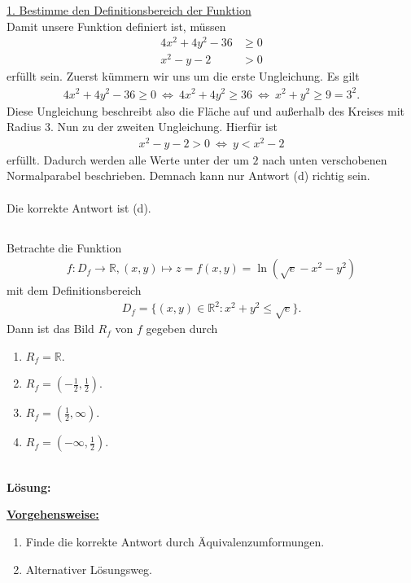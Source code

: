 \underline{1. Bestimme den Definitionsbereich der Funktion}\\
Damit unsere Funktion definiert ist, müssen 
\begin{align*}
4x^2 +4y^2 - 36 &\geq 0\\
x^2 -y -2 &> 0
\end{align*}
erfüllt sein.
Zuerst kümmern wir uns um die erste Ungleichung.
Es gilt
\begin{align*}
4x^2 + 4y^2 - 36 \geq 0 \ \Leftrightarrow \
4x^2 + 4y^2 \geq 36 
\ \Leftrightarrow \
x^2 + y^2 \geq 9 = 3^2. 
\end{align*}
Diese Ungleichung beschreibt also die Fläche auf und außerhalb des Kreises mit Radius 3.
Nun zu der zweiten Ungleichung. Hierfür ist
\begin{align*}
x^2 - y - 2 > 0 
\ \Leftrightarrow \
y < x^2 -2  
\end{align*}
erfüllt. Dadurch werden alle Werte unter der um $ 2 $ nach unten verschobenen Normalparabel beschrieben.
Demnach kann nur Antwort (d) richtig sein.\\
\\
Die korrekte Antwort ist (d).
\newpage

\subsection*{}
Betrachte die Funktion
\begin{align*}
f : D_f \to \mathbb{R}, 
(x,y) \mapsto z = f(x,y) = \ln(\sqrt{e} -x^2 -y^2)
\end{align*}
mit dem Definitionsbereich
\begin{align*}
D_f
= \{
(x,y) \in \mathbb{R}^2 : x^2 + y^2 \leq \sqrt{e}
\}.
\end{align*}
Dann ist das Bild $ R_f $ von $ f $ gegeben durch
\renewcommand{\labelenumi}{(\alph{enumi})}
\begin{enumerate}
	\item 
	$R_f = \mathbb{R} $.
	\item
	$R_f = \left( -\frac{1}{2}, \frac{1}{2} \right) $.
	\item
	$R_f = \left(  \frac{1}{2}, \infty \right) $.
	\item
	$R_f = \left( -\infty, \frac{1}{2} \right) $.
\end{enumerate}

\ \\
\textbf{Lösung:}
\begin{mdframed}
\underline{\textbf{Vorgehensweise:}}
\renewcommand{\labelenumi}{\theenumi.}
\begin{enumerate}
\item Finde die korrekte Antwort durch Äquivalenzumformungen.
\item 
Alternativer Lösungsweg.
\end{enumerate}
\end{mdframed}

